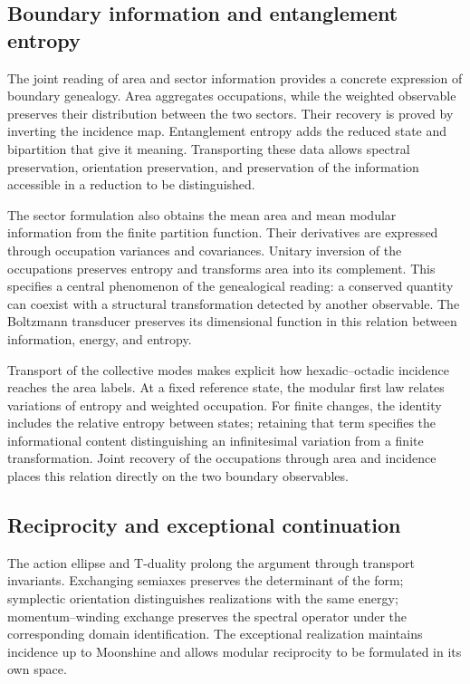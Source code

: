 \subsection{Boundary information and entanglement entropy}

The joint reading of area and sector information provides a
concrete expression of boundary genealogy. Area aggregates
occupations, while the weighted observable preserves their distribution
between the two sectors. Their recovery is proved by
inverting the incidence map. Entanglement entropy adds
the reduced state and bipartition that give it meaning. Transporting
these data allows spectral preservation,
orientation preservation, and preservation of the information accessible
in a reduction to be distinguished.

The sector formulation also obtains the mean area and mean
modular information from the finite partition function. Their
derivatives are expressed through occupation variances and covariances.
Unitary inversion of the occupations preserves entropy and
transforms area into its complement. This specifies a central
phenomenon of the genealogical reading: a conserved quantity can
coexist with a structural transformation detected by another
observable. The Boltzmann transducer preserves its dimensional function
in this relation between information, energy, and entropy.

Transport of the collective modes makes explicit how hexadic--octadic
incidence reaches the area labels. At a fixed reference state,
the modular first law relates variations of
entropy and weighted occupation. For finite changes, the identity
includes the relative entropy between states; retaining that term
specifies the informational content distinguishing an infinitesimal
variation from a finite transformation. Joint recovery
of the occupations through area and incidence places this relation
directly on the two boundary observables.

\subsection{Reciprocity and exceptional continuation}

The action ellipse and T-duality prolong the argument through
transport invariants. Exchanging semiaxes preserves the
determinant of the form; symplectic orientation distinguishes
realizations with the same energy; momentum--winding exchange
preserves the spectral operator under the corresponding domain
identification. The exceptional realization maintains incidence
up to Moonshine and allows modular reciprocity to be formulated in its
own space.

